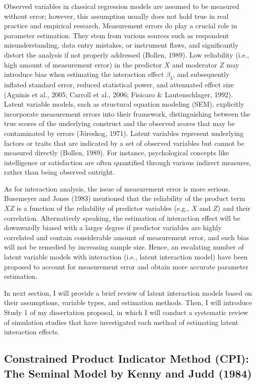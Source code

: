 \documentclass[
  11pt,
  man]{apa6}
\begin{document}
Observed variables in classical regression models are assumed to be measured without error; however, this assumption usually does not hold true in real practice and empirical research. Measurement errors do play a crucial role in parameter estimation. They stem from various sources such as respondent misunderstanding, data entry mistakes, or instrument flaws, and significantly distort the analysis if not properly addressed (Bollen, 1989). Low reliability (i.e., high amount of measurement error) in the predictor \(X\) and moderator \(Z\) may introduce bias when estimating the interaction effect \(\beta_{3}\), and subsequently inflated standard error, reduced statistical power, and attenuated effect size (Aguinis et al., 2005; Carroll et al., 2006; Fisicaro \& Lautenschlager, 1992). Latent variable models, such as structural equation modeling (SEM), explicitly incorporate measurement errors into their framework, distinguishing between the true scores of the underlying construct and the observed scores that may be contaminated by errors (Jöreskog, 1971). Latent variables represent underlying factors or traits that are indicated by a set of observed variables but cannot be measured directly (Bollen, 1989). For instance, psychological concepts like intelligence or satisfaction are often quantified through various indirect measures, rather than being observed outright.

As for interaction analysis, the issue of measurement error is more serious. Busemeyer and Jones (1983) mentioned that the reliability of the product term \(XZ\) is a function of the reliability of predictor variables (e.g., \(X\) and \(Z\)) and their correlation. Alternatively speaking, the estimation of interaction effect will be downwardly biased with a larger degree if predictor variables are highly correlated and contain considerable amount of measurement error, and such bias will not be remedied by increasing sample size. Hence, an escalating number of latent variable models with interaction (i.e., latent interaction model) have been proposed to account for measurement error and obtain more accurate parameter estimation.

In next section, I will provide a brief review of latent interaction models based on their assumptions, variable types, and estimation methods. Then, I will introduce Study 1 of my dissertation proposal, in which I will conduct a systematic review of simulation studies that have investigated each method of estimating latent interaction effects.

\hypertarget{constrained-product-indicator-method-cpi-the-seminal-model-by-kenny-and-judd-1984}{%
\subsection{Constrained Product Indicator Method (CPI): The Seminal Model by Kenny and Judd (1984)}\label{constrained-product-indicator-method-cpi-the-seminal-model-by-kenny-and-judd-1984}}
\end{document}

